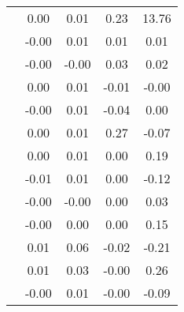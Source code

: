 \begin{table}
\begin{tabular}{c|cc|cc|}
\multicolumn{1}{|c|}{} & \multicolumn{1}{|c|}{      0.00} & \multicolumn{1}{|c|}{      0.01} & \multicolumn{1}{|c|}{      0.23} & \multicolumn{1}{|c|}{     13.76} \\ 
\multicolumn{1}{|c|}{} & \multicolumn{1}{|c|}{     -0.00} & \multicolumn{1}{|c|}{      0.01} & \multicolumn{1}{|c|}{      0.01} & \multicolumn{1}{|c|}{      0.01} \\ 
\multicolumn{1}{|c|}{} & \multicolumn{1}{|c|}{     -0.00} & \multicolumn{1}{|c|}{     -0.00} & \multicolumn{1}{|c|}{      0.03} & \multicolumn{1}{|c|}{      0.02} \\ 
\multicolumn{1}{|c|}{} & \multicolumn{1}{|c|}{      0.00} & \multicolumn{1}{|c|}{      0.01} & \multicolumn{1}{|c|}{     -0.01} & \multicolumn{1}{|c|}{     -0.00} \\ 
\multicolumn{1}{|c|}{} & \multicolumn{1}{|c|}{     -0.00} & \multicolumn{1}{|c|}{      0.01} & \multicolumn{1}{|c|}{     -0.04} & \multicolumn{1}{|c|}{      0.00} \\ 
\multicolumn{1}{|c|}{} & \multicolumn{1}{|c|}{      0.00} & \multicolumn{1}{|c|}{      0.01} & \multicolumn{1}{|c|}{      0.27} & \multicolumn{1}{|c|}{     -0.07} \\ 
\multicolumn{1}{|c|}{} & \multicolumn{1}{|c|}{      0.00} & \multicolumn{1}{|c|}{      0.01} & \multicolumn{1}{|c|}{      0.00} & \multicolumn{1}{|c|}{      0.19} \\ 
\multicolumn{1}{|c|}{} & \multicolumn{1}{|c|}{     -0.01} & \multicolumn{1}{|c|}{      0.01} & \multicolumn{1}{|c|}{      0.00} & \multicolumn{1}{|c|}{     -0.12} \\ 
\multicolumn{1}{|c|}{} & \multicolumn{1}{|c|}{     -0.00} & \multicolumn{1}{|c|}{     -0.00} & \multicolumn{1}{|c|}{      0.00} & \multicolumn{1}{|c|}{      0.03} \\ 
\multicolumn{1}{|c|}{} & \multicolumn{1}{|c|}{     -0.00} & \multicolumn{1}{|c|}{      0.00} & \multicolumn{1}{|c|}{      0.00} & \multicolumn{1}{|c|}{      0.15} \\ 
\multicolumn{1}{|c|}{} & \multicolumn{1}{|c|}{      0.01} & \multicolumn{1}{|c|}{      0.06} & \multicolumn{1}{|c|}{     -0.02} & \multicolumn{1}{|c|}{     -0.21} \\ 
\multicolumn{1}{|c|}{} & \multicolumn{1}{|c|}{      0.01} & \multicolumn{1}{|c|}{      0.03} & \multicolumn{1}{|c|}{     -0.00} & \multicolumn{1}{|c|}{      0.26} \\ 
\multicolumn{1}{|c|}{} & \multicolumn{1}{|c|}{     -0.00} & \multicolumn{1}{|c|}{      0.01} & \multicolumn{1}{|c|}{     -0.00} & \multicolumn{1}{|c|}{     -0.09} \\ 

\end{tabular}
\end{table}
